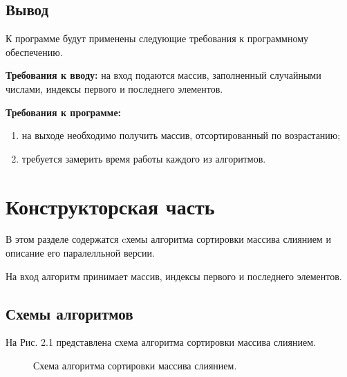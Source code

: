 \documentclass[12pt]{report}
\begin{document}
\section{Вывод}

К программе будут применены следующие требования к программному обеспечению.

\vspace{\baselineskip}

\textbf{Требования к вводу:} на вход подаются массив, заполненный случайными числами, индексы первого и последнего элементов. 

\vspace{\baselineskip}

\textbf{Требования к программе:}

\begin{enumerate}
	\item на выходе
	необходимо получить массив, отсортированный по возрастанию;
	\item требуется замерить время работы
	каждого из алгоритмов. 
\end{enumerate}


\chapter{Конструкторская часть}
В этом разделе содержатся cхемы алгоритма сортировки массива слиянием и описание его паралелльной версии.

На вход алгоритм принимает массив, индексы первого и последнего элементов. 
	
\section{Схемы алгоритмов}
На Рис. 2.1 представлена схема алгоритма сортировки массива слиянием.

\vspace{\baselineskip}

\begin{figure}[h]
	\caption{Схема алгоритма сортировки массива слиянием.}
	\label{figure:image}
\end{figure}
\end{document}
